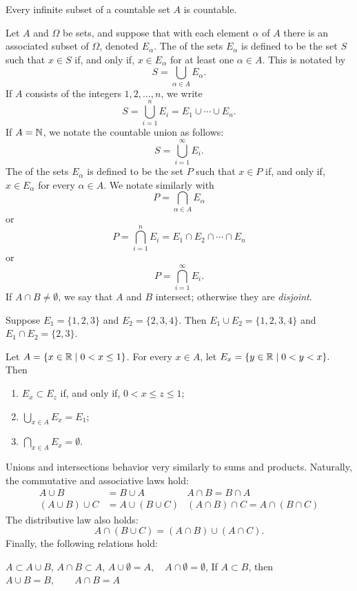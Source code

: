 \documentclass{article}
\begin{document}
\begin{theorem}
    Every infinite subset of a countable set $A$ is countable.
\end{theorem}
\begin{definition}
    Let $A$ and $\Omega$ be sets, and suppose that with each element $\alpha$ of $A$ there is an associated subset of $\Omega$, denoted $E_{\alpha}$. The  of the sets $E_{\alpha}$ is defined to be the set $S$ such that $x\in S$ if, and only if, $x\in E_{\alpha}$ for at least one $\alpha\in A$. This is notated by \[S=\bigcup_{\alpha\in A}E_{\alpha}.\]If $A$ consists of the integers $1,2,\dotsc,n$, we write \[S=\bigcup_{i=1}^{n}E_{i}=E_{1}\cup\dotsi\cup E_{n}.\]If $A=\mathbb N$, we notate the countable union as follows: \[S=\bigcup_{i=1}^{\infty}E_{i}.\]
    The  of the sets $E_{\alpha}$ is defined to be the set $P$ such that $x\in P$ if, and only if, $x\in E_{\alpha}$ for every $\alpha\in A$. We notate similarly with 
    \[P=\bigcap_{\alpha\in A}E_{\alpha}\]
    or
    \[P=\bigcap_{i=1}^{n}E_{i}=E_{1}\cap E_{2}\cap \dotsi\cap E_{n}\]
    or 
    \[P=\bigcap_{i=1}^{\infty}E_{i}.\]If $A\cap B\neq\emptyset$, we say that $A$ and $B$ intersect; otherwise they are \textit{disjoint}.
\end{definition}
\begin{example}
    \listhack 
    \item Suppose $E_{1}=\{1,2,3\}$ and $E_{2}=\{2,3,4\}$. Then $E_{1}\cup E_{2}=\{1,2,3,4\}$ and $E_{1}\cap E_{2}=\{2,3\}$.
    \item Let $A=\{x\in\mathbb R \mid 0<x\leq 1\}$. For every $x\in A$, let $E_{x}=\{y\in\mathbb R\mid 0<y<x\}.$ Then \begin{enumerate}
        \item $E_{x}\subset E_{z}$ if, and only if, $0<x\leq z\leq 1$;
        \item $\bigcup_{x\in A}E_{x}=E_{1}$;
        \item $\bigcap_{x\in A}E_{x}=\emptyset$.
    \end{enumerate}
\end{example}
\begin{remark}
    Unions and intersections behavior very similarly to sums and products. Naturally, the commutative and associative laws hold:
    \begin{align*} 
    A\cup B & = B\cup A & A\cap B =  B\cap A \\
    (A\cup B)\cup C & = A \cup (B\cup C) & (A\cap B)\cap C = A\cap (B\cap C)
    \end{align*}
    The distributive law also holds:
    \[A\cap (B\cup C)=(A\cap B)\cup (A\cap C).\]
    Finally, the following relations hold:
    \begin{enumerate}
        \ii $A\subset A\cup B$,
        \ii $A\cap B\subset A$,
        \ii $A\cup \emptyset = A,\quad A\cap \emptyset = \emptyset$,
        \ii If $A\subset B$, then $A\cup B=B,\quad\quad A\cap B=A$ 
    \end{enumerate}
\end{remark}
\end{document}
